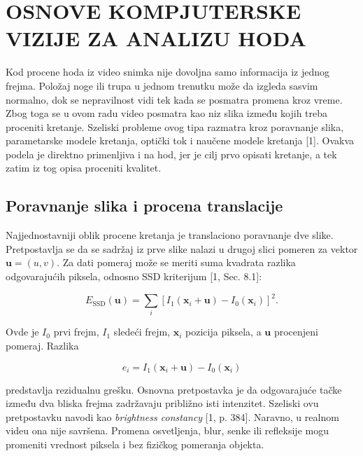 ﻿\documentclass[12pt,a4paper]{report}
\begin{document}
%
%

\chapter{OSNOVE KOMPJUTERSKE VIZIJE ZA ANALIZU HODA}

Kod procene hoda iz video snimka nije dovoljna samo informacija iz jednog frejma. Položaj noge ili trupa u jednom trenutku može da izgleda sasvim normalno, dok se nepravilnost vidi tek kada se posmatra promena kroz vreme. Zbog toga se u ovom radu video posmatra kao niz slika između kojih treba proceniti kretanje. Szeliski probleme ovog tipa razmatra kroz poravnanje slika, parametarske modele kretanja, optički tok i naučene modele kretanja [1]. Ovakva podela je direktno primenljiva i na hod, jer je cilj prvo opisati kretanje, a tek zatim iz tog opisa proceniti kvalitet.

\section{Poravnanje slika i procena translacije}

Najjednostavniji oblik procene kretanja je translaciono poravnanje dve slike. Pretpostavlja se da se sadržaj iz prve slike nalazi u drugoj slici pomeren za vektor $\mathbf{u}=(u,v)$. Za dati pomeraj može se meriti suma kvadrata razlika odgovarajućih piksela, odnosno SSD kriterijum [1, Sec. 8.1]:

\begin{equation}
E_{\mathrm{SSD}}(\mathbf{u})=
\sum_i \left[I_1(\mathbf{x}_i+\mathbf{u})-I_0(\mathbf{x}_i)\right]^2.
\label{eq:ssd_alignment}
\end{equation}

Ovde je $I_0$ prvi frejm, $I_1$ sledeći frejm, $\mathbf{x}_i$ pozicija piksela, a $\mathbf{u}$ procenjeni pomeraj. Razlika

\begin{equation}
e_i=I_1(\mathbf{x}_i+\mathbf{u})-I_0(\mathbf{x}_i)
\end{equation}

predstavlja rezidualnu grešku. Osnovna pretpostavka je da odgovarajuće tačke između dva bliska frejma zadržavaju približno isti intenzitet. Szeliski ovu pretpostavku navodi kao \textit{brightness constancy} [1, p. 384]. Naravno, u realnom videu ona nije savršena. Promena osvetljenja, blur, senke ili refleksije mogu promeniti vrednost piksela i bez fizičkog pomeranja objekta.
\end{document}
